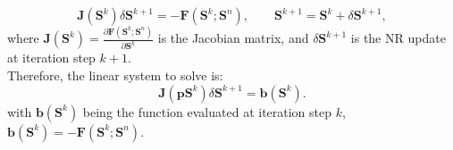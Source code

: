 \documentclass[12pt]{article}
\begin{document}
$$\mathbf{J}(\mathbf{S}^k)\delta\mathbf{S}^{k+1}=-\mathbf{F}(\mathbf{S}^k;\mathbf{S}^n),
\qquad \mathbf{S}^{k+1}=\mathbf{S}^k+\delta \mathbf{S}^{k+1},$$
where $\mathbf{J}(\mathbf{S}^k)=\frac{\partial \mathbf{F}(\mathbf{S}^k;\mathbf{S}^n)}{\partial \mathbf{S}^k}$ is the 
Jacobian matrix, and $\delta \mathbf{S}^{k+1}$ is the NR update at iteration step $k+1$.\\
Therefore, the linear system to solve is:\\
\begin{equation}\label{eq:lsS}
\mathbf{J}(\mathbf{pS}^k)\delta \mathbf{S}^{k+1}=\mathbf{b}(\mathbf{S}^k).
\end{equation}
with $\mathbf{b}(\mathbf{S}^k)$ being the function evaluated at iteration step $k$, $\mathbf{b}(\mathbf{S}^k)=-\mathbf{F}(\mathbf{S}^k;\mathbf{S}^n)$.\\
\end{document}
